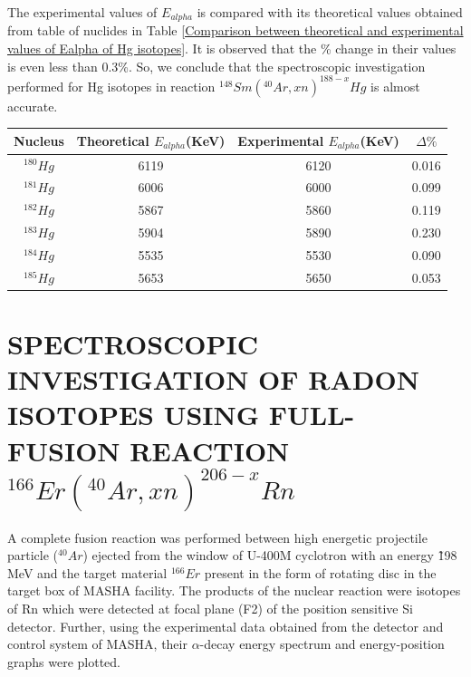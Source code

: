 \documentclass[12pt]{article}
\begin{document}
The experimental values of $E_{alpha}$ is compared with its theoretical values obtained from table of nuclides in Table \ref{Comparison between theoretical and experimental values of Ealpha of Hg isotopes}. It is observed that the \% change in their values is even less than 0.3\%. So, we conclude that the spectroscopic investigation performed for Hg isotopes in reaction $^{148}Sm(^{40}Ar,xn)^{188-x}Hg$ is almost accurate.
\begin{center}
\begin{tabular}{|c|c|c|c|}
\hline
Nucleus & Theoretical $E_{alpha}$(KeV) & Experimental $E_{alpha}$(KeV) & $\Delta\%$ \\
\hline
\hline
$^{180}Hg$ & 6119 & 6120 & 0.016 \\
\hline
$^{181}Hg$ & 6006 & 6000 & 0.099 \\
\hline
$^{182}Hg$ & 5867 & 5860 & 0.119 \\
\hline
$^{183}Hg$ & 5904 & 5890 & 0.230 \\
\hline
$^{184}Hg$ & 5535 & 5530 & 0.090 \\
\hline
$^{185}Hg$ & 5653 & 5650 & 0.053 \\
\hline
\end{tabular}
\label{Comparison between theoretical and experimental values of Ealpha of Hg isotopes}
\end{center}

\section{SPECTROSCOPIC INVESTIGATION OF RADON ISOTOPES USING FULL-FUSION REACTION $^{166}Er(^{40}Ar,xn)^{206-x}Rn$}
A complete fusion reaction was performed between high energetic projectile particle ($^{40}Ar$) ejected from the window of U-400M cyclotron with an energy \~ 198 MeV and the target material $^{166}Er$ present in the form of rotating disc in the target box of MASHA facility. The products of the nuclear reaction were isotopes of Rn which were detected at focal plane (F2) of the position sensitive Si detector. Further, using the experimental data obtained from the detector and control system of MASHA, their $\alpha$-decay energy spectrum and energy-position graphs were plotted.   
\end{document}
